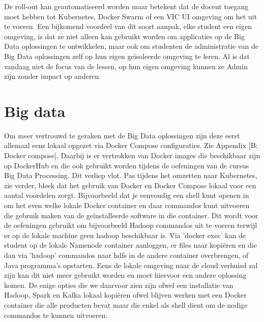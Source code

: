 \newline
De roll-out kan geautomatiseerd worden maar betekent dat de docent toegang moet hebben tot Kubernetes, Docker Swarm of een VIC UI omgeving om het uit te voeren.
\newline
Een bijkomend voordeel van dit soort aanpak, elke student een eigen omgeving, is dat ze niet alleen kan gebruikt worden om applicaties op de Big Data oplossingen te ontwikkelen, maar ook om studenten de administratie van de Big Data oplossingen zelf op hun eigen geïsoleerde omgeving te leren. Al is dat vandaag niet de focus van de lessen, op hun eigen omgeving kunnen ze Admin zijn zonder impact op anderen.
\newline
\newline


\section{Big data}
Om meer vertrouwd te geraken met de Big Data oplossingen zijn deze eerst allemaal eens lokaal opgezet via Docker Compose configuraties. Zie Appendix [B: Docker compose].
Daarbij is er vertrokken van Docker images die beschikbaar zijn op DockerHub en die ook gebruikt worden tijdens de oefeningen van de cursus Big Data Processing.
\newline
\newline
Dit verliep vlot. Pas tijdens het omzetten naar Kubernetes, zie verder, bleek dat het gebruik van Docker en Docker Compose lokaal voor een aantal voordelen zorgt. Bijvoorbeeld dat je eenvoudig een shell kunt openen in om het even welke lokale Docker container en daar commandos kunt uitvoeren die gebruik maken van de geïnstalleerde software in die container. Dit wordt voor de oefeningen gebruikt om bijvoorbeeld Hadoop commandos uit te voeren terwijl er op de lokale machine geen hadoop beschikbaar is. Via 'docker exec' kan de student op de lokale Namenode container aanloggen, er files naar kopiëren en die dan via 'hadoop' commandos naar hdfs in de andere container overbrengen, of Java programma's opstarten.
Eens de lokale omgeving naar de cloud verhuisd zal zijn kan dit niet meer gebruikt worden en moet hiervoor een andere oplossing komen. De enige opties die we daarvoor zien zijn ofwel een installatie van Hadoop, Spark en Kafka lokaal kopiëren ofwel blijven werken met een Docker container die alle producten bevat maar die enkel als shell dient om de nodige commandos te kunnen uitvoeren.
\newline

